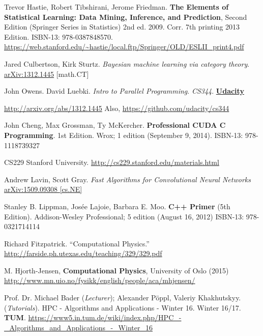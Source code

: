 \documentclass[10pt]{amsart}
\begin{document}
\begin{thebibliography}{9}
Trevor Hastie, Robert Tibshirani, Jerome Friedman.   \textbf{The Elements of Statistical Learning: Data Mining, Inference, and Prediction}, Second Edition (Springer Series in Statistics) 2nd ed. 2009. Corr. 7th printing 2013 Edition.  ISBN-13: 978-0387848570.  \url{https://web.stanford.edu/~hastie/local.ftp/Springer/OLD/ESLII_print4.pdf}

Jared Culbertson, Kirk Sturtz.  \emph{Bayesian machine learning via category theory}.  \href{http://arxiv.org/abs/1312.1445}{arXiv:1312.1445} [math.CT]

John Owens.  David Luebki.  \emph{Intro to Parallel Programming}.  \emph{CS344}.  \textbf{\href{https://www.udacity.com/}{Udacity}}  
  
\url{http://arxiv.org/abs/1312.1445} Also, \url{https://github.com/udacity/cs344}  

John Cheng, Max Grossman, Ty McKercher.  \textbf{Professional CUDA C Programming}.  1st Edition.  Wrox; 1 edition (September 9, 2014).  ISBN-13: 978-1118739327



CS229 Stanford University.  \url{http://cs229.stanford.edu/materials.html}



Andrew Lavin, Scott Gray.  \emph{Fast Algorithms for Convolutional Neural Networks} \href{https://arxiv.org/abs/1509.09308}{arXiv:1509.09308 [cs.NE]}


Stanley B. Lippman, Jos\'{e}e Lajoie, Barbara E. Moo. \textbf{C++ Primer} (5th Edition).  Addison-Wesley Professional; 5 edition (August 16, 2012) ISBN-13: 978-0321714114 



Richard Fitzpatrick.  ``Computational Physics.''  \url{http://farside.ph.utexas.edu/teaching/329/329.pdf}

 M. Hjorth-Jensen, \textbf{Computational Physics}, University of Oslo (2015) \url{http://www.mn.uio.no/fysikk/english/people/aca/mhjensen/}

Prof. Dr. Michael Bader (\emph{Lecturer});  Alexander Pöppl, Valeriy Khakhutskyy.  (\emph{Tutorials}).  HPC - Algorithms and Applications - Winter 16.  Winter 16/17.  \textbf{TUM}.  \url{https://www5.in.tum.de/wiki/index.php/HPC_-_Algorithms_and_Applications_-_Winter_16}  

 

\end{thebibliography}
\end{document}
